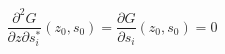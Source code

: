 \begin{equation}
\frac{\partial^2 G}{\partial z \partial s^{*}_{i}}(z_{0},s_{0}) =
\frac{\partial G}{\partial s_{i}}(z_{0},s_{0}) = 0 \label{PDZ}
\end{equation}


